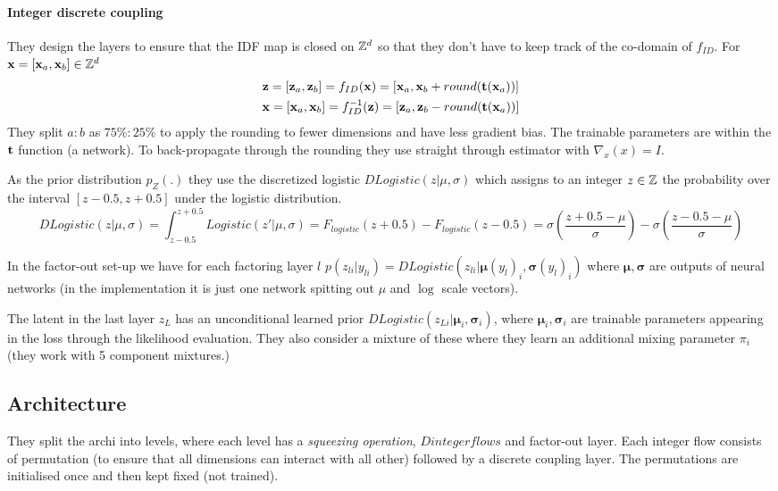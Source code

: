 \paragraph{Integer discrete coupling} They design the layers to ensure that the IDF map is closed on $\mathbb{Z}^d$ so that they don't have to keep track of the co-domain of $f_{ID}$.
For $\mathbf{x} = [\mathbf{x}_a, \mathbf{x}_b] \in \mathbb{Z}^d$
\begin{gather}\label{eqdfc:coupling}
\mathbf{z} = [\mathbf{z}_a, \mathbf{z}_b] = f_{ID}(\mathbf{x}) = [\mathbf{x}_a, \mathbf{x}_{b} + round(\mathbf{t}(\mathbf{x}_a))]\nonumber \\
\mathbf{x} = [\mathbf{x}_a, \mathbf{x}_b] = f_{ID}^{-1}(\mathbf{z}) = [\mathbf{z}_{a}, \mathbf{z}_{b} - round(\mathbf{t}(\mathbf{x}_a))]
\end{gather}
They split $a:b$ as $75\%:25\%$ to apply the rounding to fewer dimensions and have less gradient bias.
The trainable parameters are within the $\mathbf{t}$ function (a network). To back-propagate through the rounding they use straight through estimator with $\nabla_x(x) = I$.

As the prior distribution $p_Z(.)$ they use the discretized logistic $DLogistic(z | \mu, \sigma)$ which assigns to an integer $z \in \mathbb{Z}$ the probability over the interval $[z - 0.5, z + 0.5]$ under the logistic distribution.
\begin{equation*}
DLogistic(z | \mu, \sigma) = \int_{z-0.5}^{z+0.5} Logistic(z' | \mu, \sigma) = F_{logistic}(z+0.5) - F_{logistic}(z-0.5) = \sigma(\frac{z+0.5-\mu}{\sigma}) - \sigma(\frac{z-0.5-\mu}{\sigma})
\end{equation*}

In the factor-out set-up we have for each factoring layer $l$ $p(z_{li} | y_{li}) = DLogistic(z_{li} | \pmb{\mu}(y_{l})_i, \pmb{\sigma}(y_{l})_i)$ where $\pmb{\mu}, \pmb{\sigma}$ are outputs of neural networks (in the implementation it is just one network spitting out $\mu$ and $\log$ scale vectors).

The latent in the last layer $z_L$ has an unconditional learned prior $DLogistic(z_{Li} | \pmb{\mu}_i, \pmb{\sigma}_i)$, where $\pmb{\mu}_i, \pmb{\sigma}_i$ are trainable parameters appearing in the loss through the likelihood evaluation. They also consider a mixture of these where they learn an additional mixing parameter $\pi_i$ (they work with 5 component mixtures.)

\subsection{Architecture}

They split the archi into levels, where each level has a \emph{squeezing operation}, $D integer flows$ and factor-out layer. Each integer flow consists of permutation (to ensure that all dimensions can interact with all other) followed by a discrete coupling layer. The permutations are initialised once and then kept fixed (not trained).

